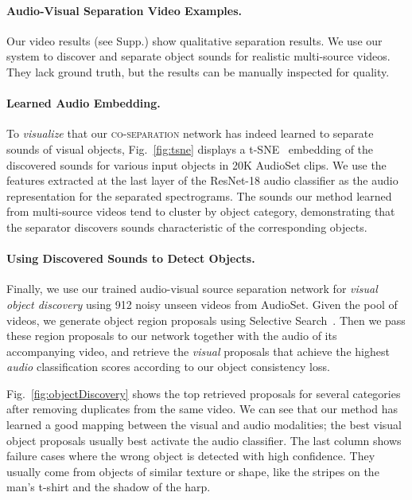 \documentclass[10pt,twocolumn,letterpaper]{article}
\begin{document}
\paragraph{Audio-Visual Separation Video Examples.}
Our video results (see Supp.) show qualitative separation results. We use our system to discover and separate object sounds for realistic multi-source videos. They lack ground truth, but the results can be manually inspected for quality.

\vspace*{-0.15in}
\paragraph{Learned Audio Embedding.}
To \emph{visualize} that our \textsc{co-separation} network has indeed learned to separate sounds of visual objects, Fig.~\ref{fig:tsne} displays a t-SNE~\cite{maaten2008visualizing} embedding of the discovered sounds for various input objects in 20K AudioSet clips. We use the features extracted at the last layer of the ResNet-18 audio classifier as the audio representation for the separated spectrograms. The sounds our method learned from multi-source videos tend to cluster by object category, demonstrating that the separator discovers sounds characteristic of the corresponding objects.

\vspace*{-0.15in}
\paragraph{Using Discovered Sounds to Detect Objects.} Finally, we use our trained audio-visual source separation network for \emph{visual object discovery} using 912 noisy unseen videos from AudioSet. Given the pool of videos, we generate object region proposals using Selective Search~\cite{uijlings2013selective}. Then we pass these region proposals to our network together with the audio of its accompanying video, and retrieve the \emph{visual} proposals that achieve the highest \emph{audio} classification scores according to our object consistency loss.

\vspace*{0.05in}

Fig.~\ref{fig:objectDiscovery} shows the top retrieved proposals for several categories after removing duplicates from the same video. We can see that our method has learned a good mapping between the visual and audio modalities; the best visual object proposals usually best activate the audio classifier. The last column shows failure cases where the wrong object is detected with high confidence. They usually come from objects of similar texture or shape, like the stripes on the man's t-shirt and the shadow of the harp.
\end{document}
